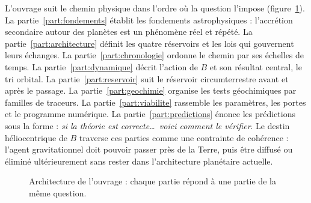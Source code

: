\documentclass[11pt,a4paper,openany]{report}
\newcommand{\RD}{\mathcal{R}_{D}}
\begin{document}
L'ouvrage suit le chemin physique dans l'ordre où la question l'impose
(figure~\ref{fig:plan}). La partie~\ref{part:fondements} établit les fondements astrophysiques :
l'accrétion secondaire autour des planètes est un phénomène réel et répété. La
partie~\ref{part:architecture} définit les quatre réservoirs et les lois qui gouvernent leurs
échanges. La partie~\ref{part:chronologie} ordonne le chemin par ses échelles de temps. La
partie~\ref{part:dynamique} décrit l'action de $B$ et son résultat central, le tri orbital. La
partie~\ref{part:reservoir} suit le réservoir circumterrestre avant et après le passage. La
partie~\ref{part:geochimie} organise les tests géochimiques par familles de traceurs. La
partie~\ref{part:viabilite} rassemble les paramètres, les portes et le programme numérique. La
partie~\ref{part:predictions} énonce les prédictions sous la forme : \emph{si la théorie est
correcte\dots\ voici comment le vérifier}.
Le destin héliocentrique de $B$ traverse ces parties comme une contrainte de cohérence : l'agent
gravitationnel doit pouvoir passer près de la Terre, puis être diffusé ou éliminé ultérieurement
sans rester dans l'architecture planétaire actuelle.

\begin{figure}[htbp]
\centering
{}
\caption{Architecture de l'ouvrage : chaque partie répond à une partie de la même question.}
\label{fig:plan}
\end{figure}
\end{document}
